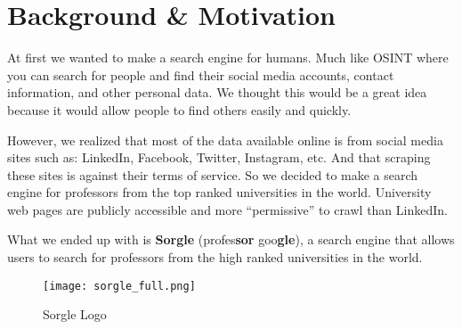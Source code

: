 \section{Background \& Motivation}

At first we wanted to make a search engine for humans. Much like OSINT where you can search for people and find their social media accounts, contact information, and other personal data. We thought this would be a great idea because it would allow people to find others easily and quickly.

However, we realized that most of the data available online is from social media sites such as: LinkedIn, Facebook, Twitter, Instagram, etc. And that scraping these sites is against their terms of service. So we decided to make a search engine for professors from the top ranked universities in the world. University web pages are publicly accessible and more “permissive” to crawl than LinkedIn.

What we ended up with is \textbf{Sorgle} (profes\textbf{sor} goo\textbf{gle}), a search engine that allows users to search for professors from the high ranked universities in the world.

\begin{figure}[h]
    \centering
    \texttt{[image: sorgle\_full.png]}
    \caption{Sorgle Logo}
    \label{fig:sorgle-logo}
\end{figure}